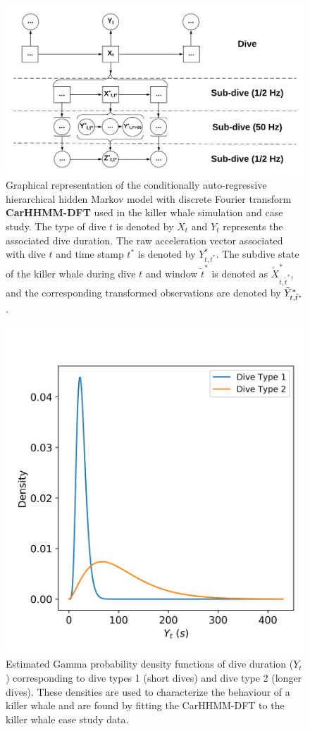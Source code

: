 \begin{figure}[ht]
	\centering
	\includegraphics[width=5in]{../Plots/CarHHMM-DFT.png}
	\caption{Graphical representation of the conditionally auto-regressive hierarchical hidden Markov model with discrete Fourier transform \textbf{CarHHMM-DFT} used in the killer whale simulation and case study. The type of dive $t$ is denoted by $X_t$ and $Y_t$ represents the associated dive duration. The raw acceleration vector associated with dive $t$ and time stamp $t^*$ is denoted by $Y^*_{t,t^*}$. The subdive state of the killer whale during dive $t$ and window $\tilde t^*$ is denoted as $\tilde X^*_{t,\tilde t^*}$, and the corresponding transformed observations are denoted by $\tilde{Y}^*_{t,\tilde t^*}$.}
	\label{fig:CarHHMM-DFT}
\end{figure}

\begin{figure}[ht]
	\centering
	\includegraphics[width=5in]{../Plots/CarHHMM2-coarse-emissions.png}
	\caption{Estimated Gamma probability density functions of dive duration ($Y_t$) corresponding to dive types 1 (short dives) and dive type 2 (longer dives). These  densities are used to characterize the behaviour of a killer whale and are found by fitting the CarHHMM-DFT to the killer whale case study data.}
	\label{fig:coarse_emis}
\end{figure}

